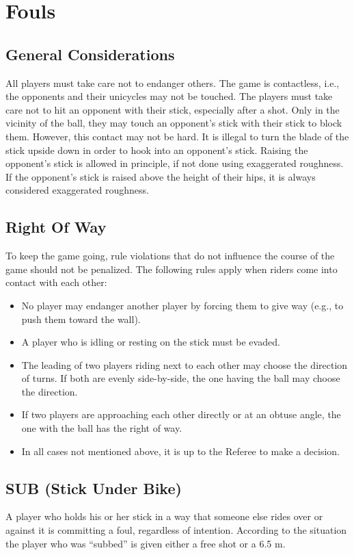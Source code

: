 \section{Fouls}

\subsection{General Considerations}
All players must take care not to endanger others.
The game is contactless, i.e., the opponents and their unicycles may not be touched.
The players must take care not to hit an opponent with their stick, especially after a shot.
Only in the vicinity of the ball, they may touch an opponent's stick with their stick to block them.
However, this contact may not be hard.
It is illegal to turn the blade of the stick upside down in order to hook into an opponent's stick.
Raising the opponent's stick is allowed in principle, if not done using exaggerated roughness.
If the opponent's stick is raised above the height of their hips, it is always considered exaggerated roughness.

\subsection{Right Of Way}
To keep the game going, rule violations that do not influence the course of the game should not be penalized.
The following rules apply when riders come into contact with each other:
\begin{itemize}
\item No player may endanger another player by forcing them to give way (e.g., to push them toward the wall).
\item A player who is idling or resting on the stick must be evaded.
\item The leading of two players riding next to each other may choose the direction of turns. If both are evenly side-by-side, the one having the ball may choose the direction.
\item If two players are approaching each other directly or at an obtuse angle, the one with the ball has the right of way.
\item In all cases not mentioned above, it is up to the Referee to make a decision.
\end{itemize}

\subsection{SUB (Stick Under Bike)}
A player who holds his or her stick in a way that someone else rides over or against it is committing a foul, regardless of intention.
According to the situation the player who was ``subbed'' is given either a free shot or a 6.5 m.

